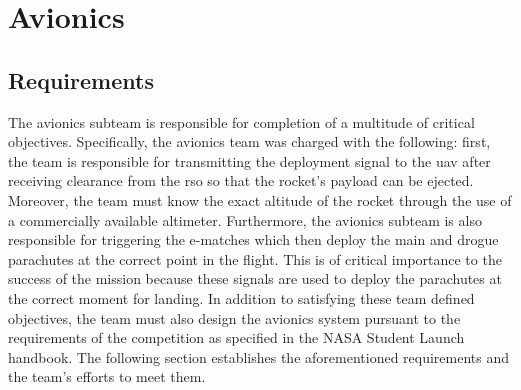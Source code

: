 \chapter{Avionics}
\section{Requirements}
The avionics subteam is responsible for completion of a multitude of critical objectives. Specifically, the avionics team was charged with the following: first, the team is responsible for transmitting the deployment signal to the \gls{uav} after receiving clearance from the \gls{rso} so that the rocket’s payload can be ejected. Moreover, the team must know the exact altitude of the rocket through the use of a commercially available altimeter.
Furthermore, the avionics subteam is also responsible for triggering the e-matches which then deploy the main and drogue parachutes
at the correct point in the flight. This is of critical importance to the success of the mission because these signals are used to deploy the parachutes at the correct moment for landing.
In addition to satisfying these team defined objectives, the team must also design the avionics system pursuant to the requirements of the competition as specified in the NASA Student Launch handbook. The following section establishes the aforementioned requirements and the team’s efforts to meet them. 

